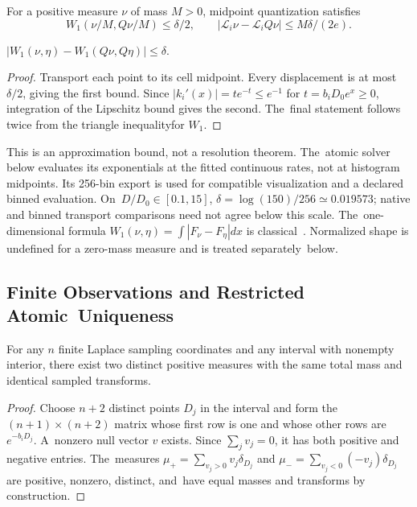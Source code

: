 \documentclass[mathematics,article,accept,moreauthors]{Definitions/mdpi}
\begin{document}
\begin{Proposition}\label{prop:quantization}
For a positive measure $\nu$ of mass $M>0$, midpoint quantization satisfies
\begin{equation}\label{eq:quantization}
 W_1(\nu/M,Q\nu/M)\leq\delta/2,\qquad
 |\mathcal L_i\nu-\mathcal L_iQ\nu|\leq M\delta/(2e).
\end{equation}

$|W_1(\nu,\eta)-W_1(Q\nu,Q\eta)|\leq\delta$.
\end{Proposition}
\begin{proof}
Transport each point to its cell midpoint. Every displacement is at most $\delta/2$, giving the first bound. Since
$|k_i'(x)|=t e^{-t}\leq e^{-1}$ for $t=b_iD_0e^x\geq0$, integration of the Lipschitz bound gives the second. The~final statement follows twice from the triangle inequality\linebreak   for $W_1$.
\end{proof}

This is an approximation bound, not a resolution theorem. The~atomic solver below evaluates its exponentials at the fitted continuous rates, not at histogram midpoints. Its 256-bin export is used for compatible visualization and a declared binned evaluation. On~$D/D_0\in[0.1,15]$, $\delta=\log(150)/256\simeq0.019573$; native and binned transport comparisons need not agree below this scale. The~one-dimensional formula $W_1(\nu,\eta)=\int|F_\nu-F_\eta|dx$ is classical~\cite{vallender}. Normalized shape is undefined for a zero-mass measure and is treated separately~below.

\subsection{Finite Observations and Restricted Atomic~Uniqueness}
\begin{Proposition}\label{prop:ambiguity}
For any $n$ finite Laplace sampling coordinates and any interval with nonempty interior, there exist two distinct positive measures with the same total mass and identical sampled transforms.
\end{Proposition}
\begin{proof}
Choose $n+2$ distinct points $D_j$ in the interval and form the $(n+1)\times(n+2)$ matrix whose first row is one and whose other rows are $e^{-b_iD_j}$. A~nonzero null vector $v$ exists. Since $\sum_jv_j=0$, it has both positive and negative entries. The~measures $\mu_+=\sum_{v_j>0}v_j\delta_{D_j}$ and $\mu_-=\sum_{v_j<0}(-v_j)\delta_{D_j}$ are positive, nonzero, distinct, and~have equal masses and transforms by construction.
\end{proof}
\end{document}
